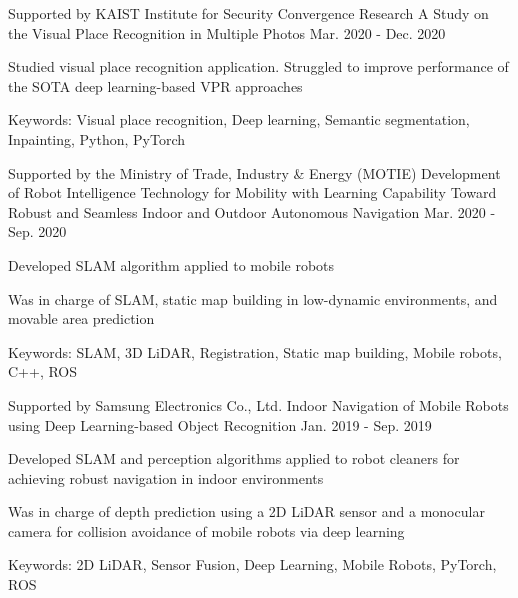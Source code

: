\begin{cventries}
  \cventry
    {Supported by KAIST Institute for Security Convergence Research} %
    {A Study on the Visual Place Recognition in Multiple Photos} %
    {\urban} %
    {Mar. 2020 - Dec. 2020} %
    {
      \begin{cvitems} %
        \item Studied visual place recognition application. Struggled to improve performance of the SOTA deep learning-based VPR approaches
        \item Keywords: Visual place recognition, Deep learning, Semantic segmentation, Inpainting, Python, PyTorch
      \end{cvitems}
    }

  \cventry
    {Supported by the Ministry of Trade, Industry \& Energy (MOTIE)} %
    {Development of Robot Intelligence Technology for Mobility with Learning Capability Toward Robust and Seamless Indoor and Outdoor Autonomous Navigation} %
    {\urban} %
    {Mar. 2020 - Sep. 2020} %
    {
      \begin{cvitems} %
        \item Developed SLAM algorithm applied to mobile robots
        \item Was in charge of SLAM, static map building in low-dynamic environments, and movable area prediction
        \item Keywords: SLAM, 3D LiDAR, Registration, Static map building, Mobile robots, C++, ROS
      \end{cvitems}
    }

  \cventry
    {Supported by Samsung Electronics Co., Ltd.} %
    {Indoor Navigation of Mobile Robots using Deep Learning-based Object Recognition} %
    {\urban} %
    {Jan. 2019 - Sep. 2019} %
    {
      \begin{cvitems} %
        \item Developed SLAM and perception algorithms applied to robot cleaners for achieving robust navigation in indoor environments
        \item Was in charge of depth prediction using a 2D LiDAR sensor and a monocular camera for collision avoidance of mobile robots via deep learning
        \item Keywords: 2D LiDAR, Sensor Fusion, Deep Learning, Mobile Robots, PyTorch, ROS
      \end{cvitems}
    }


\end{cventries}
